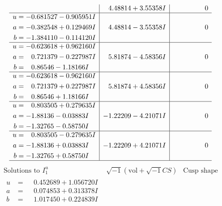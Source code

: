 \documentclass[1p]{elsarticle_modified}
\theoremstyle{definition}
\newcommand{\I}{\sqrt{-1}}
\begin{document}
$$\begin{array}{c|c|c}
 & \phantom{-}4.48814 + 3.55358 I & \phantom{-0.000000 } 0 \\ \hline\begin{aligned}
u &= -0.681527 - 0.905951 I \\
a &= -0.382548 + 0.129469 I \\
b &= -1.384110 - 0.114120 I\end{aligned}
 & \phantom{-}4.48814 - 3.55358 I & \phantom{-0.000000 } 0 \\ \hline\begin{aligned}
u &= -0.623618 + 0.962160 I \\
a &= \phantom{-}0.721379 - 0.227987 I \\
b &= \phantom{-}0.86546 - 1.18166 I\end{aligned}
 & \phantom{-}5.81874 - 4.58356 I & \phantom{-0.000000 } 0 \\ \hline\begin{aligned}
u &= -0.623618 - 0.962160 I \\
a &= \phantom{-}0.721379 + 0.227987 I \\
b &= \phantom{-}0.86546 + 1.18166 I\end{aligned}
 & \phantom{-}5.81874 + 4.58356 I & \phantom{-0.000000 } 0 \\ \hline\begin{aligned}
u &= \phantom{-}0.803505 + 0.279635 I \\
a &= -1.88136 - 0.03883 I \\
b &= -1.32765 - 0.58750 I\end{aligned}
 & -1.22209 - 4.21071 I & \phantom{-0.000000 } 0 \\ \hline\begin{aligned}
u &= \phantom{-}0.803505 - 0.279635 I \\
a &= -1.88136 + 0.03883 I \\
b &= -1.32765 + 0.58750 I\end{aligned}
 & -1.22209 + 4.21071 I & \phantom{-0.000000 } 0\\
 \hline 
 \end{array}$$\newpage$$\begin{array}{c|c|c}  
\text{Solutions to }I^u_{1}& \I (\text{vol} + \sqrt{-1}CS) & \text{Cusp shape}\\
 \hline 
\begin{aligned}
u &= \phantom{-}0.452689 + 1.056720 I \\
a &= \phantom{-}0.074853 + 0.313378 I \\
b &= \phantom{-}1.017450 + 0.224839 I\end{aligned}

\end{array}$$
\end{document}
